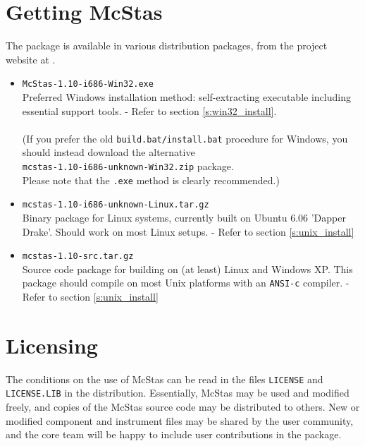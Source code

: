 \label{s:install}

\section{Getting McStas}
\label{s:obtain}
The  package is
available in various distribution packages, from the project
website at
.
\begin{itemize}
\item{\texttt{McStas-1.10-i686-Win32.exe}\\Preferred Windows
    installation method: self-extracting executable
    including essential support tools. - Refer to section
    \ref{s:win32_install}. \\\ \\(If you prefer the old \verb+build.bat/install.bat+
    procedure for Windows, you should instead download the alternative 
    \\\texttt{mcstas-1.10-i686-unknown-Win32.zip} package. \\Please note that
    the \verb+.exe+ method is clearly recommended.)}
\item{\texttt{mcstas-1.10-i686-unknown-Linux.tar.gz}\\Binary package
  for Linux systems, currently built on Ubuntu 6.06 'Dapper Drake'.
  Should work on most Linux setups.
 - Refer to section \ref{s:unix_install}}
\item{\texttt{mcstas-1.10-src.tar.gz}\\Source code package for
    building  on
    (at least) Linux and Windows XP. This package should compile on
    most Unix platforms with an \texttt{ANSI-c} compiler. - Refer to section \ref{s:unix_install}}
\end{itemize}

\section{Licensing}
The conditions on the use of McStas can be read in the files
\verb+LICENSE+ and \verb+LICENSE.LIB+ in the distribution. Essentially,
McStas may be used and modified freely, and copies of the McStas source code
may be distributed to others.
New or modified component and instrument files may be shared by
the user community, and the core team will be happy to include user contributions in the package.

